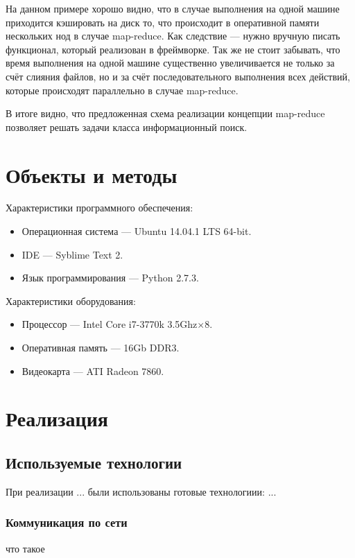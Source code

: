 \documentclass[12pt,a4paper,oneside]{extarticle}
\begin{document}
            На данном примере хорошо видно, что в случае выполнения на одной машине приходится кэшировать на диск то, что происходит в оперативной памяти нескольких нод в случае map-reduce. Как следствие --- нужно вручную писать функционал, который реализован в фреймворке. Так же не стоит забывать, что время выполнения на одной машине существенно увеличивается не только за счёт слияния файлов, но и за счёт последовательного выполнения всех действий, которые происходят параллельно в случае map-reduce.

            В итоге видно, что предложенная схема реализации концепции map-reduce позволяет решать задачи класса информационный поиск.
        
    \clearpage
\clearpage

\section{Объекты и методы}      
        \noindent Характеристики программного обеспечения:
        \begin{itemize}
            \item Операционная система --- Ubuntu 14.04.1 LTS 64-bit.
            \item IDE --- Syblime Text 2.
            \item Язык программирования --- Python 2.7.3.
        \end{itemize}
        
        \noindent Характеристики оборудования:
        \begin{itemize}
            \item Процессор --- Intel Core i7-3770k 3.5Ghz$\times$8.
            \item Оперативная память --- 16Gb DDR3.
            \item Видеокарта --- ATI Radeon 7860.
        \end{itemize}
\clearpage

\section{Реализация}
    \subsection{Используемые технологии}
        При реализации ... были использованы готовые технологиии: ...

        \subsubsection{Коммуникация по сети}
            что такое
\end{document}
